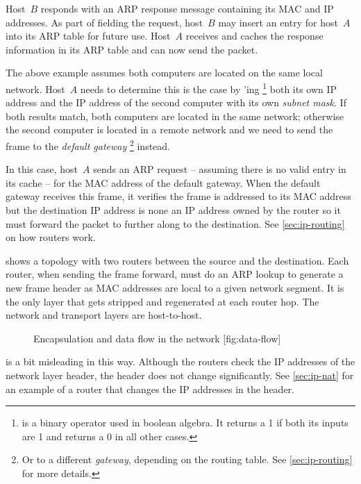 Host~$B$ responds with an \acs{ARP} response message containing its \acs{MAC} and \acs{IP} addresses.
As part of fielding the request, host~$B$ may insert an entry for host~$A$ into its \acs{ARP} table for future use.
Host~$A$ receives and caches the response information in its \acs{ARP} table and can now send the packet.

The above example assumes both computers are located on the same local network.
Host~$A$ needs to determine this is the case by 'ing%
\footnote{ is a binary operator used in boolean algebra. It returns a 1 if both its inputs are 1 and returns a 0 in all other cases.}
both its own \acs{IP} address and the \acs{IP} address of the second computer with its own \emph{subnet mask}.%
If both results match, both computers are located in the same network; otherwise the second computer is located in a remote network and we need to send the frame to the \emph{default gateway}%
\footnote{Or to a different \emph{gateway}, depending on the routing table. See \vref{sec:ip-routing} for more details.}
instead.%

In this case, host~$A$ sends an \acs{ARP} request -- assuming there is no valid entry in its cache -- for the \acs{MAC} address of the default gateway.
When the default gateway receives this frame, it verifies the frame is addressed to its \acs{MAC} address but the destination \acs{IP} address is none an \acs{IP} address owned by the router so it must forward the packet to further along to the destination.
See \vref{sec:ip-routing} on how routers work.

 shows a topology with two routers between the source and the destination.
Each router, when sending the frame forward, must do an \acs{ARP} lookup to generate a new frame header as \acs{MAC} addresses are local to a given network segment.
It is the only layer that gets stripped and regenerated at each router hop.
The network and transport layers are host-to-host.


\begin{figure}
\begin{sidecaption}%
   {Encapsulation and data flow in the network}
   [fig:data-flow]
\centering

\end{sidecaption}
\end{figure}


 is a bit misleading in this way.
Although the routers check the \acs{IP} addresses of the network layer header, the header does not change significantly.
See \vref{sec:ip-nat} for an example of a router that changes the \acs{IP} addresses in the header.


